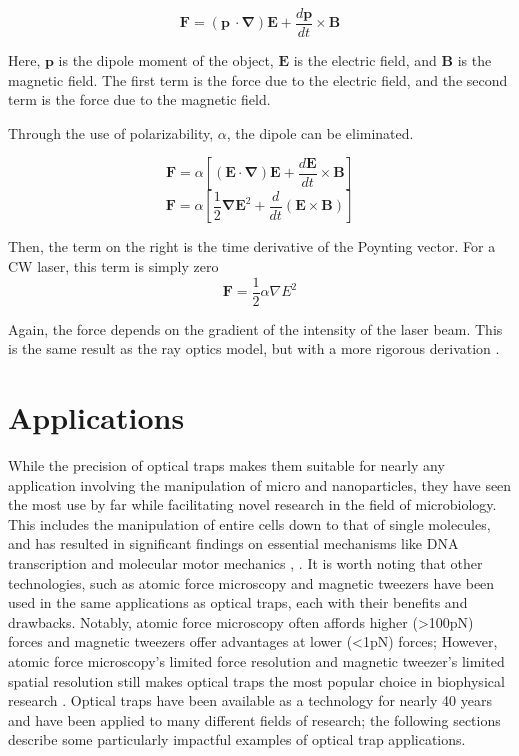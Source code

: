 \documentclass{article}
\begin{document}
\[ \mathbf{F} = (\mathbf{p}\ \cdot\mathbf{\nabla})\mathbf{E} + \frac{d\mathbf{p}}{dt}\times\mathbf{B} \]

Here, $\mathbf{p}$ is the dipole moment of the object, $\mathbf{E}$ is the electric field, and $\mathbf{B}$ is the magnetic field. The first term is the force due to the electric field, and the second term is the force due to the magnetic field.

Through the use of polarizability, $\alpha$, the dipole can be eliminated.

\[ \mathbf{F} = \alpha\left[ (\mathbf{E}\cdot\mathbf{\nabla})\mathbf{E} + \frac{d\mathbf{E}}{dt}\times\mathbf{B} \right]  \]
\[ \mathbf{F} = \alpha\left[ \frac{1}{2}\mathbf{\nabla}\mathbf{E}^2 + \frac{d}{dt}(\mathbf{E}\times\mathbf{B}) \right]  \]

Then, the term on the right is the time derivative of the Poynting vector. For a CW laser, this term is simply zero
\[ \mathbf{F} = \frac{1}{2}\alpha\nabla E^2 \]

Again, the force depends on the gradient of the intensity of the laser beam. This is the same result as the ray optics model, but with a more rigorous derivation \cite{UToronto}.


\section*{Applications}

While the precision of optical traps makes them suitable for nearly any application involving the manipulation of micro and nanoparticles, they have seen the most use by far while facilitating novel research in the field of microbiology. This includes the manipulation of entire cells down to that of single molecules, and has resulted in significant findings on essential mechanisms like DNA transcription and molecular motor mechanics \cite{Bustamante2021}, \cite{2018_Polimeno}. It is worth noting that other technologies, such as atomic force microscopy and magnetic tweezers have been used in the same applications as optical traps, each with their benefits and drawbacks. Notably, atomic force microscopy often affords higher (>100pN) forces and magnetic tweezers offer advantages at lower (<1pN) forces; However, atomic force microscopy's limited force resolution and magnetic tweezer's limited spatial resolution still makes optical traps the most popular choice in biophysical research \cite{Bustamante2021}. Optical traps have been available as a technology for nearly 40 years and have been applied to many different fields of research; the following sections describe some particularly impactful examples of optical trap applications.
\end{document}
